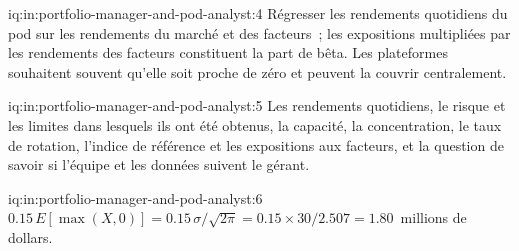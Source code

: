 \begin{solution}{iq:in:portfolio-manager-and-pod-analyst:4}
Régresser les rendements quotidiens du pod sur les rendements du marché et des facteurs~; les expositions multipliées par les rendements des facteurs constituent la part de bêta.
Les plateformes souhaitent souvent qu'elle soit proche de zéro et peuvent la couvrir centralement.
\end{solution}

\begin{solution}{iq:in:portfolio-manager-and-pod-analyst:5}
Les rendements quotidiens, le risque et les limites dans lesquels ils ont été obtenus, la capacité, la concentration, le taux de rotation, l'indice de référence et
les expositions aux facteurs, et la question de savoir si l'équipe et les données suivent le gérant.
\end{solution}

\begin{solution}{iq:in:portfolio-manager-and-pod-analyst:6}
$0.15\,E[\max(X,0)]=0.15\,\sigma/\sqrt{2\pi}=0.15\times30/2.507=1.80$~millions de dollars.
\end{solution}
